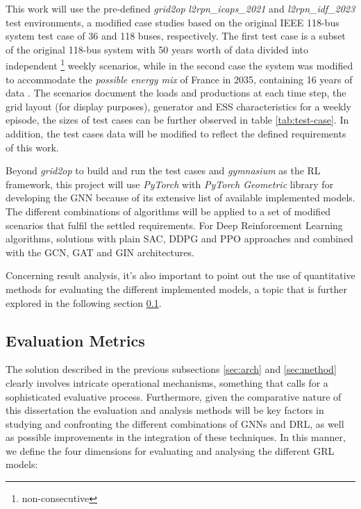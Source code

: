 This work will use the pre-defined \textit{grid2op} \textit{l2rpn\_icaps\_2021} and \textit{l2rpn\_idf\_2023} test environments, a modified case studies based on the original IEEE 118-bus system test case \cite{christiePowerSystemsTesta} of 36 and 118 buses, respectively. The first test case is a subset of the original 118-bus system with 50 years worth of data divided into independent \footnote{non-consecutive} weekly scenarios, while in the second case the system was modified to accommodate the \textit{possible energy mix} of France in 2035, containing 16 years of data \cite{rtefranceGrid2OpDocumentation}. The scenarios document the loads and productions at each time step, the grid layout (for display purposes), generator and \ac{ESS} characteristics \cite{rtefranceGrid2OpDocumentation} for a weekly episode, the sizes of test cases can be further observed in table \ref{tab:test-case}. In addition, the test cases data will be modified to reflect the defined requirements of this work. \par
Beyond \textit{grid2op} to build and run the test cases and \textit{gymnasium} as the RL framework, this project will use \textit{PyTorch} \cite{pytorchPyTorch} with \textit{PyTorch Geometric} \cite{pygteamPyGPytorch_geometric} library for developing the \ac{GNN} because of its extensive list of available implemented models. The different combinations of algorithms will be applied to a set of modified scenarios that fulfil the settled requirements. For Deep Reinforcement Learning algorithms, solutions with plain \ac{SAC}, \ac{DDPG} and \ac{PPO} approaches and combined with the \ac{GCN}, \ac{GAT} and \ac{GIN} architectures.  \par
Concerning result analysis, it's also important to point out the use of quantitative methods for evaluating the different implemented models, a topic that is further explored in the following section \ref{sec:eval-methods}.


\subsection{Evaluation Metrics} \label{sec:eval-methods}

The solution described in the previous subsections \ref{sec:arch} and \ref{sec:method} clearly involves intricate operational mechanisms, something that calls for a sophisticated evaluative process. Furthermore, given the comparative nature of this dissertation the evaluation and analysis methods will be key factors in studying and confronting the different combinations of \acp{GNN} and \ac{DRL}, as well as possible improvements in the integration of these techniques.
In this manner, we define the four dimensions for evaluating and analysing the different \ac{GRL} models:

